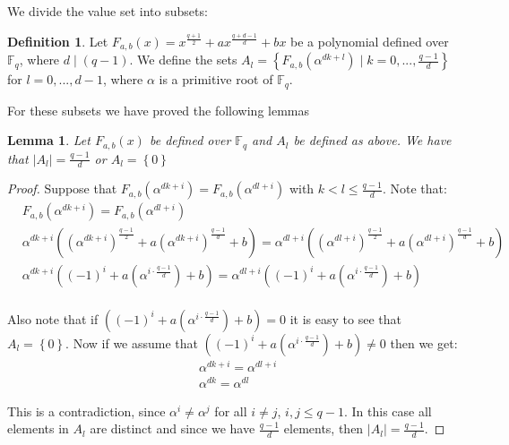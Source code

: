 \documentclass{article}
\newtheorem{lemma}[theorem]{Lemma}
\theoremstyle{definition}
\newtheorem{definition}[theorem]{Definition}
\theoremstyle{remark}
\numberwithin{equation}{section}
\begin{document}
We divide the value set into subsets:

  \begin{definition}
      Let $F_{a,b}(x) = x^{\frac{q+1}{2}} + a x^{\frac{q+d-1}{d}} + b x$ be a polynomial defined over $\mathbb{F}_{q}$, where $d \mid (q-1)$. We define the sets $A_l = \left\{F_{a,b}(\alpha^{d k+l}) \mid k=0,...,\frac{q-1}{d}\right\}$ for $l=0,...,d-1$, where $\alpha$ is a primitive root of $\mathbb{F}_{q}$.
    \end{definition}

    For these subsets we have proved the following lemmas

    \begin{lemma}\label{tamanos_conjuntos}
      Let $F_{a,b}(x)$ be defined over $\mathbb{F}_{q}$ and $A_l$ be defined as above. We have that $\left\vert A_l \right\vert = \frac{q-1}{d}$ or $A_l = \left\{ 0 \right\}$
    \end{lemma}

    \begin{proof}
      Suppose that $F_{a,b}(\alpha^{dk+i})=F_{a,b}(\alpha^{dl+i})$ with $k<l\leq \frac{q-1}{d}$. Note that:
      \begin{align*}
      &F_{a,b}(\alpha^{dk+i})=F_{a,b}(\alpha^{dl+i}) \\
      &\alpha^{dk+i}((\alpha^{dk+i})^{\frac{q-1}{2}}+a(\alpha^{dk+i})^{\frac{q-1}{d}}+b) = \alpha^{dl+i}((\alpha^{dl+i})^{\frac{q-1}{2}}+a(\alpha^{dl+i})^{\frac{q-1}{d}}+b) \\
      &\alpha^{dk+i}((-1)^{i}+a(\alpha^{i\cdot \frac{q-1}{d}})+b) = \alpha^{dl+i}((-1)^{i}+a(\alpha^{i\cdot \frac{q-1}{d}})+b) \\
      \end{align*}

      Also note that if $((-1)^{i}+a(\alpha^{i\cdot \frac{q-1}{d}})+b) = 0$ it is easy to see that $A_{l} = \left\{0\right\}$. Now if we assume that $((-1)^{i}+a(\alpha^{i\cdot \frac{q-1}{d}})+b) \neq 0$ then we get:
      \begin{align*}
      &\alpha^{dk+i} = \alpha^{dl+i} \\
      &\alpha^{dk} = \alpha^{dl}
      \end{align*}

      This is a contradiction, since $\alpha^{i} \neq \alpha^{j}$ for all $i \neq j$, $i,j \leq q-1$. In this case all elements in $A_{l}$ are distinct and since we have $\frac{q-1}{d}$ elements, then $\left\vert A_{l} \right\vert = \frac{q-1}{d}$.
    \end{proof}
\end{document}

